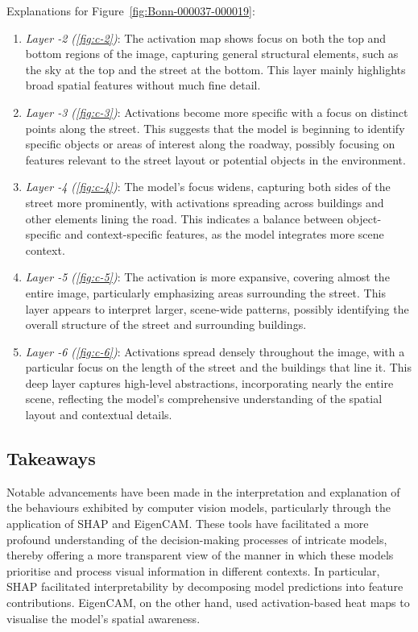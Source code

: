 Explanations for Figure~\ref{fig:Bonn-000037-000019}:
\begin{enumerate}
    \item \textit{Layer -2 (\ref{fig:c-2})}: The activation map shows focus on both the top and bottom regions of the image, capturing general structural elements, such as the sky at the top and the street at the bottom. This layer mainly highlights broad spatial features without much fine detail.
    \item \textit{Layer -3 (\ref{fig:c-3})}: Activations become more specific with a focus on distinct points along the street. This suggests that the model is beginning to identify specific objects or areas of interest along the roadway, possibly focusing on features relevant to the street layout or potential objects in the environment.
    \item \textit{Layer -4 (\ref{fig:c-4})}: The model's focus widens, capturing both sides of the street more prominently, with activations spreading across buildings and other elements lining the road. This indicates a balance between object-specific and context-specific features, as the model integrates more scene context.
    \item \textit{Layer -5 (\ref{fig:c-5})}: The activation is more expansive, covering almost the entire image, particularly emphasizing areas surrounding the street. This layer appears to interpret larger, scene-wide patterns, possibly identifying the overall structure of the street and surrounding buildings.
    \item \textit{Layer -6 (\ref{fig:c-6})}:  Activations spread densely throughout the image, with a particular focus on the length of the street and the buildings that line it. This deep layer captures high-level abstractions, incorporating nearly the entire scene, reflecting the model's comprehensive understanding of the spatial layout and contextual details.

\end{enumerate}

\subsection{Takeaways}\label{subsec:takeaways-and-suggestions-for-future-development}


Notable advancements have been made in the interpretation and explanation of the behaviours exhibited by computer vision models, particularly through the application of SHAP and EigenCAM.
These tools have facilitated a more profound understanding of the decision-making processes of intricate models, thereby offering a more transparent view of the manner in which these models prioritise and process visual information in different contexts.
In particular, SHAP facilitated interpretability by decomposing model predictions into feature contributions.
EigenCAM, on the other hand, used activation-based heat maps to visualise the model's spatial awareness.

